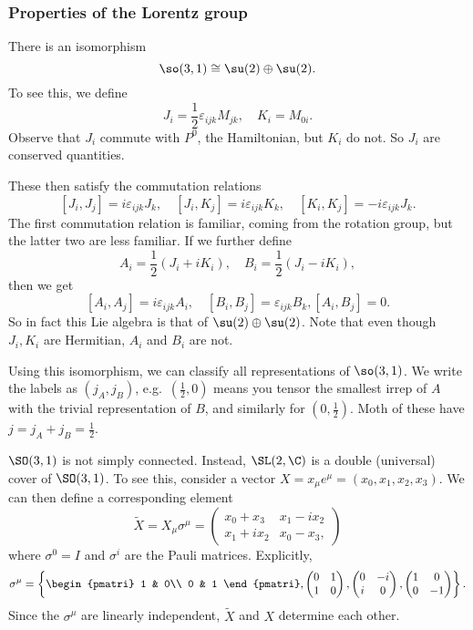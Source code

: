\documentclass[a4paper]{article}
\begin{document}
\subsubsection*{Properties of the Lorentz group}
There is an isomorphism
\[
  \so(3, 1) \cong \su(2) \oplus \su(2).
\]
To see this, we define
\[
  J_i = \frac{1}{2} \varepsilon_{ijk} M_{jk},\quad K_i = M_{0i}.
\]
Observe that $J_i$ commute with $P^0$, the Hamiltonian, but $K_i$ do not. So $J_i$ are conserved quantities.

These then satisfy the commutation relations
\[
  [J_i, J_j] = i\varepsilon_{ijk} J_k,\quad [J_i, K_j] = i \varepsilon_{ijk} K_k,\quad [K_i, K_j] = -i \varepsilon_{ijk} J_k.
\]
The first commutation relation is familiar, coming from the rotation group, but the latter two are less familiar. If we further define
\[
  A_i = \frac{1}{2} (J_i + i K_i),\quad B_i = \frac{1}{2} (J_i - i K_i),
\]
then we get
\[
  [A_i, A_j] = i \varepsilon_{ijk} A_i,\quad [B_i, B_j] = \varepsilon_{ijk} B_k, [A_i, B_j] = 0.
\]
So in fact this Lie algebra is that of $\su(2) \oplus \su(2)$. Note that even though $J_i, K_i$ are Hermitian, $A_i$ and $B_i$ are not.

Using this isomorphism, we can classify all representations of $\so(3, 1)$. We write the labels as $(j_A, j_B)$, e.g.\ $(\frac{1}{2}, 0)$ means you tensor the smallest irrep  of $A$ with the trivial representation of $B$, and similarly for $(0, \frac{1}{2})$. Moth of these have $j = j_A + j_B = \frac{1}{2}$.

$\SO(3, 1)$ is not simply connected. Instead, $\SL(2, \C)$ is a double (universal) cover of $\SO(3, 1)$. To see this, consider a vector $X = x_\mu e^\mu = (x_0, x_1, x_2, x_3)$. We can then define a corresponding element
\[
  \tilde{X} = X_\mu \sigma^\mu =
  \begin{pmatrix}
    x_0 + x_3 & x_1 - i x_2\\
    x_1 + i x_2 & x_0 - x_3,
  \end{pmatrix}
\]
where $\sigma^0 = I$ and $\sigma^i$ are the Pauli matrices. Explicitly,
\[
  \sigma^\mu = \left\{
    \begin{pmatri}
      1 & 0\\
      0 & 1
    \end{pmatri},
    \begin{pmatrix}
      0 & 1\\
      1 & 0
    \end{pmatrix},
    \begin{pmatrix}
      0 & -i\\
      i & 0
    \end{pmatrix},
    \begin{pmatrix}
      1 & 0\\
      0 & -1
    \end{pmatrix}
  \right\}.
\]
Since the $\sigma^\mu$ are linearly independent, $\tilde{X}$ and $X$ determine each other.
\end{document}
